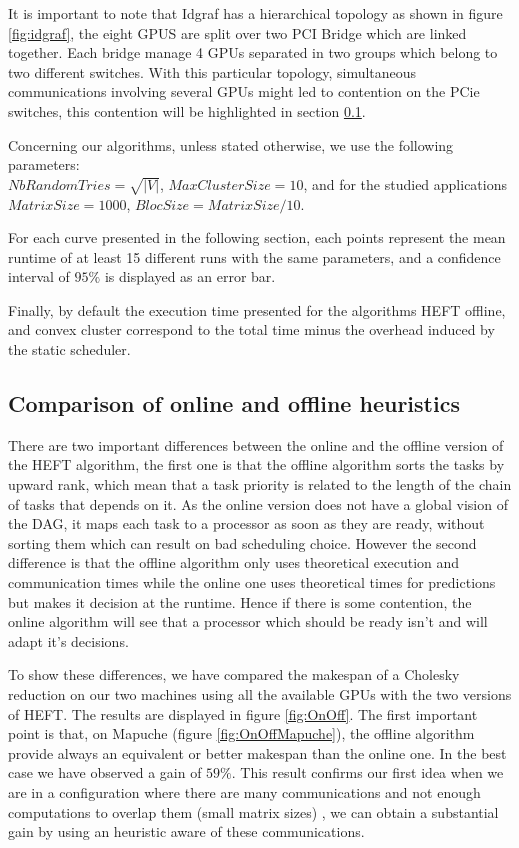 \documentclass[10pt, conference, compsocconf,pdftex,dvipsnames]{IEEEtran}
\begin{document}
It is important to note that Idgraf has a hierarchical topology as shown in
figure \ref{fig:idgraf}, the eight GPUS are split over two PCI Bridge which
are linked together. Each bridge manage 4 GPUs separated in two groups which
belong to two different switches. With this particular topology, simultaneous
communications involving several GPUs might led to contention on the PCie switches,
this contention will be highlighted in section \ref{sec:exp-exp-perf}.

Concerning our algorithms, unless stated otherwise, we use the following
parameters:\\
$NbRandomTries=\sqrt{|V|}$, $MaxClusterSize=10$, and for the
studied applications\\
$MatrixSize=1000$, $BlocSize=MatrixSize/10$.

For each curve presented in the following section, each points represent the
mean runtime of at least 15 different runs with the same parameters, and a
confidence interval of $95\%$ is displayed as an error bar.

Finally, by default the execution time presented for the algorithms HEFT
offline, and convex cluster correspond to the total time minus the overhead
induced by the static scheduler.

\subsection{Comparison of online and offline heuristics}
\label{sec:exp-exp-perf}

There are two important differences between the online and the offline version
of the HEFT algorithm, the first one is that the offline algorithm sorts the
tasks by upward rank, which mean that a task priority is related to the length
of the chain of tasks that depends on it. As the online version does not have
a global vision of the DAG, it maps each task to a processor as soon as they are
ready, without sorting them which can result on bad scheduling choice. However
the second difference is that the offline algorithm only uses theoretical
execution and communication times while the online one uses theoretical times
for predictions but makes it decision at the runtime. Hence if there is some
contention, the online algorithm will see that a processor which should be
ready isn't and will adapt it's decisions.

To show these differences, we have compared the makespan of a Cholesky
reduction on our two machines using all the available GPUs  with the two
versions of HEFT. The results are displayed in figure \ref{fig:OnOff}. The
first important point is that, on Mapuche (figure \ref{fig:OnOffMapuche}), the
offline algorithm provide always an equivalent or better makespan than the
online one. In the best case we have observed a gain of $59\%$. This result
confirms our first idea when we are in a configuration where there are many
communications and not enough computations to overlap them (small matrix
sizes) , we can obtain a substantial gain by using an heuristic aware of these
communications. 
\end{document}
